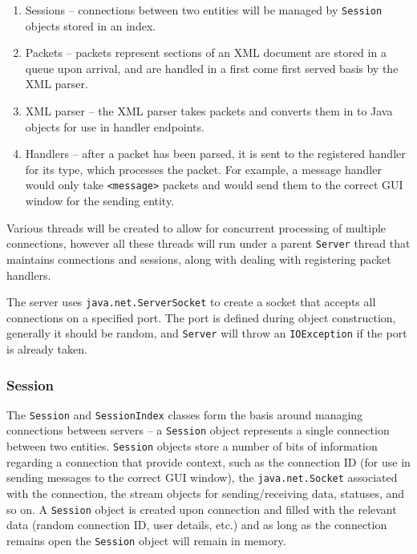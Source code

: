     \begin{enumerate}
      \item Sessions -- connections between two entities will be managed by \verb!Session! objects stored in an index.
      \item Packets -- packets represent sections of an XML document are stored in a queue upon arrival, and are handled in a first come first served basis by the XML parser.
      \item XML parser -- the XML parser takes packets and converts them in to Java objects for use in handler endpoints.
      \item Handlers -- after a packet has been parsed, it is sent to the registered handler for its type, which processes the packet. For example, a message handler would only take \verb!<message>! packets and would send them to the correct GUI window for the sending entity.
    \end{enumerate}
    
    Various threads will be created to allow for concurrent processing of multiple connections, however all these threads will run under a parent \verb!Server! thread that maintains connections and sessions, along with dealing with registering packet handlers.
    
    The server uses \verb!java.net.ServerSocket! to create a socket that accepts all connections on a specified port. The port is defined during object construction, generally it should be random, and \verb!Server! will throw an \verb!IOException! if the port is already taken.
    
    \subsubsection{Session}
    
    The \verb!Session! and \verb!SessionIndex! classes form the basis around managing connections between servers -- a \verb!Session! object represents a single connection between two entities. \verb!Session! objects store a number of bits of information regarding a connection that provide context, such as the connection ID (for use in sending messages to the correct GUI window), the \verb!java.net.Socket! associated with the connection, the stream objects for sending/receiving data, statuses, and so on. A \verb!Session! object is created upon connection and filled with the relevant data (random connection ID, user details, etc.) and as long as the connection remains open the \verb!Session! object will remain in memory.
    
